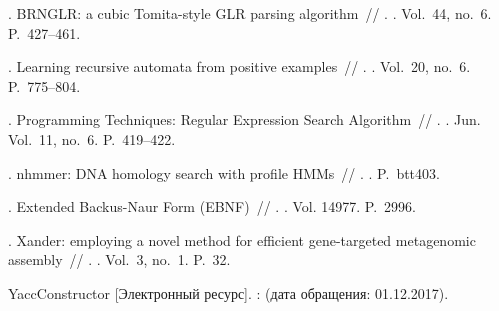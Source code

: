 \begin{thebibliography}{10}
	. {BRNGLR}: a
	cubic Tomita-style {GLR} parsing algorithm~// .
	\BibDash
	. \BibDash
	\newblock Vol.~44, no.~6. \BibDash
	\newblock P.~427--461.
	
	. Learning recursive automata from positive
	examples~// . \BibDash
	. \BibDash
	\newblock Vol.~20, no.~6. \BibDash
	\newblock P.~775--804.
	
	. Programming Techniques: Regular Expression Search
	Algorithm~// \href{http://dx.doi.org/10.1145/363347.363387}{}. \BibDash
	. \BibDash Jun. \BibDash
	\newblock Vol.~11, no.~6. \BibDash
	\newblock P.~419--422.
	
	. nhmmer: DNA homology search with
	profile HMMs~// . \BibDash
	. \BibDash
	\newblock P.~btt403.
	
	. Extended Backus-Naur Form ({EBNF})~//
	. \BibDash
	. \BibDash
	\newblock Vol. 14977. \BibDash
	\newblock P.~2996.
	
	. Xander: employing a novel method for efficient gene-targeted metagenomic
	assembly~//
	\href{http://dx.doi.org/10.1186/s40168-015-0093-6}{}.
	\BibDash
	. \BibDash
	\newblock Vol.~3, no.~1. \BibDash
	\newblock P.~32.
	
	YaccConstructor [Электронный ресурс]. \BibDash
	:
	 ({дата обращения}:
	01.12.2017).
	
\end{thebibliography}
